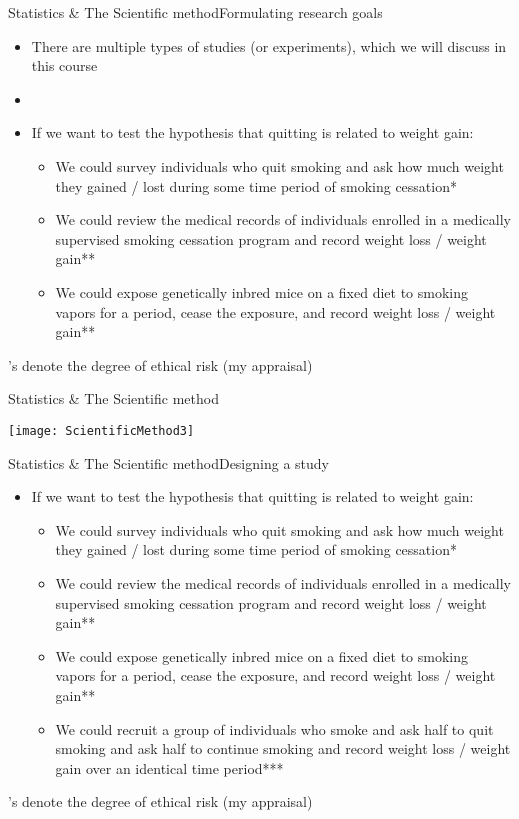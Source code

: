 \documentclass[xcolor=dvipsnames]{beamer}
\begin{document}
\begin{frame}{Statistics \& The Scientific method}{Formulating research goals}
	\begin{itemize}
		\item There are multiple types of studies (or experiments), which we will discuss in this course
		\item[]
		\item If we want to test the hypothesis that quitting is related to weight gain:
		\begin{itemize}
			\item We could survey individuals who quit smoking and ask how much weight they gained / lost during some time period of smoking cessation*
			\item We could review the medical records of individuals enrolled in a medically supervised smoking cessation program and record weight loss / weight gain**
			\item We could expose genetically inbred mice on a fixed diet to smoking vapors for a period, cease the exposure, and record weight loss / weight gain**
		\end{itemize}
	\end{itemize}
{\tiny *’s denote the degree of ethical risk (my appraisal)}
\end{frame}

\begin{frame}{Statistics \& The Scientific method}
	\vspace{-12pt}
	\begin{center}
		\texttt{[image: ScientificMethod3]}
	\end{center}
\end{frame}

\begin{frame}{Statistics \& The Scientific method}{Designing a study}
	\begin{itemize}
		\item If we want to test the hypothesis that quitting is related to weight gain:
		\begin{itemize}
			\item We could survey individuals who quit smoking and ask how much weight they gained / lost during some time period of smoking cessation*
			\item We could review the medical records of individuals enrolled in a medically supervised smoking cessation program and record weight loss / weight gain**
			\item We could expose genetically inbred mice on a fixed diet to smoking vapors for a period, cease the exposure, and record weight loss / weight gain**
			\item We could recruit a group of individuals who smoke and ask half to quit smoking and ask half to continue smoking and record weight loss / weight gain over an identical time period***
		\end{itemize}
	\end{itemize}
{\tiny *’s denote the degree of ethical risk (my appraisal)}
\end{frame}
\end{document}
